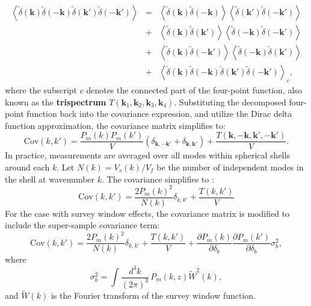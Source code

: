 \begin{eqnarray}
    \left\langle \tilde{\delta}(\mathbf{k}) \tilde{\delta}(-\mathbf{k}) \tilde{\delta}(\mathbf{k'}) \tilde{\delta}(-\mathbf{k'}) \right\rangle 
    &=& \left\langle \tilde{\delta}(\mathbf{k}) \tilde{\delta}(-\mathbf{k}) \right\rangle \left\langle \tilde{\delta}(\mathbf{k'}) \tilde{\delta}(-\mathbf{k'}) \right\rangle \nonumber \\
    &+& \left\langle \tilde{\delta}(\mathbf{k}) \tilde{\delta}(\mathbf{k'}) \right\rangle \left\langle \tilde{\delta}(-\mathbf{k}) \tilde{\delta}(-\mathbf{k'}) \right\rangle \nonumber \\
    &+& \left\langle \tilde{\delta}(\mathbf{k}) \tilde{\delta}(-\mathbf{k'}) \right\rangle \left\langle \tilde{\delta}(-\mathbf{k}) \tilde{\delta}(\mathbf{k'}) \right\rangle \nonumber \\ 
    &+& \left\langle \tilde{\delta}(\mathbf{k}) \tilde{\delta}(-\mathbf{k}) \tilde{\delta}(\mathbf{k'}) \tilde{\delta}(-\mathbf{k'}) \right\rangle_c,
\end{eqnarray}
where the subscript \( c \) denotes the connected part of the four-point function, also known as the \textbf{trispectrum} \( T(\mathbf{k}_1, \mathbf{k}_2, \mathbf{k}_3, \mathbf{k}_4) \).
Substituting the decomposed four-point function back into the covariance expression, and utilize the Dirac delta function approximation, the covariance matrix simplifies to:
\begin{equation}
    \mathrm{Cov}(k, k') = \frac{P_m(k) P_m(k')}{V} (\delta_{\mathbf{k}, -\mathbf{k'}} + \delta_{\mathbf{k}, \mathbf{k'}}) + \frac{T(\mathbf{k}, -\mathbf{k}, \mathbf{k'}, -\mathbf{k'})}{V}.
\end{equation}
In practice, measurements are averaged over all modes within spherical shells around each \( k \). Let \( N(k) = V_s(k)/V_f\) be the number of independent modes in the shell at wavenumber \( k \). The covariance simplifies to \citep{2017JCAP...11..051B}:
\begin{equation}
    \mathrm{Cov}(k, k') = \frac{2 P_m(k)^2}{N(k)} \delta_{k,k'} + \frac{T(k, k')}{V}
\end{equation}
For the case with survey window effects, the covariance matrix is modified to include the super-sample covariance term:
\begin{equation}
    \mathrm{Cov}(k, k') = \frac{2 P_m(k)^2}{N(k)} \delta_{k,k'} + \frac{T(k, k')}{V} + \frac{\partial P_m(k)}{\partial \delta_b} \frac{\partial P_m(k')}{\partial \delta_b} \sigma_b^2,
\end{equation}
where
\begin{equation}
    \sigma_b^2 = \int \frac{d^3 k}{(2\pi)^3} \, P_m(k, z) \tilde{W}^2(k),
\end{equation}
and \( \tilde{W}(k) \) is the Fourier transform of the survey window function.

